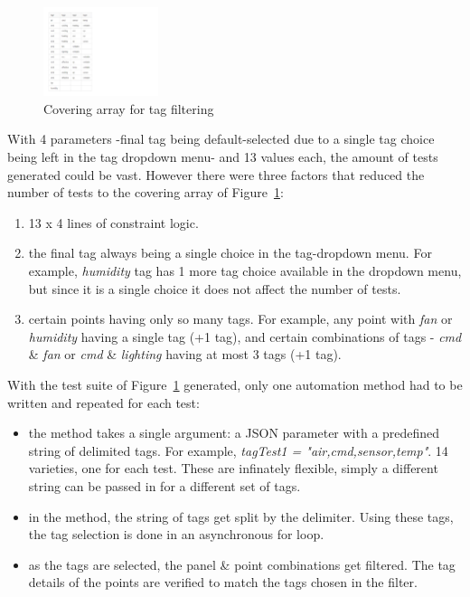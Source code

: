 \documentclass[conference]{IEEEtran}
\begin{document}
	\begin{figure}[!b]
		\centering
		\includegraphics[width=0.30\textwidth,]{tagFilterCoveringArray.pdf}
		\caption{Covering array for tag filtering}
		\label{fig:tagFilterCoveringArray}
	\end{figure}


	With 4 parameters -final tag being default-selected due to a single tag choice being left in the tag dropdown menu- and 13 values each, the amount of tests generated could be vast. 
	However there were three factors that reduced the number of tests to the covering array of Figure~\ref{fig:tagFilterCoveringArray}:
	
	\begin{enumerate}
		\item 13 x 4 lines of constraint logic.
		\item the final tag always being a single choice in the tag-dropdown menu. For example, \textit{humidity} tag has 1 more tag choice available in the dropdown menu, but since it is a single choice it does not affect  the number of tests.
		\item certain points having only so many tags. For example, any point with \textit{fan} or \textit{humidity} having a single tag (+1 tag), and certain combinations of tags - \textit{cmd} \& \textit{fan} or \textit{cmd} \& \textit{lighting} having at most 3 tags (+1 tag).
	\end{enumerate}

	With the test suite of Figure~\ref{fig:tagFilterCoveringArray} generated, only one automation method had to be written and repeated for each test:
	
	\begin{itemize}
		\item the method takes a single argument: a JSON parameter with a predefined string of delimited tags. For example, \textit{tagTest1 = "air,cmd,sensor,temp"}. 14 varieties, one for each test. These are infinately flexible, simply a different string can be passed in for a different set of tags.
		\item in the method, the string of tags get split by the delimiter. Using these tags, the tag selection is done in an asynchronous for loop. 
		\item as the tags are selected, the panel \& point combinations get filtered. The tag details of the points are verified to match the tags chosen in the filter.
	\end{itemize}
	
\end{document}
